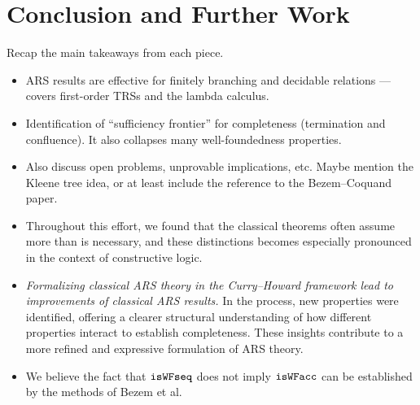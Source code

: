 \section{Conclusion and Further Work}
\label{sec:Conclusion}

Recap the main takeaways from each piece.
\begin{itemize}
  \item ARS results are effective for finitely branching and decidable relations
  --- covers first-order TRSs and the lambda calculus.
  \item Identification of ``sufficiency frontier'' for completeness (termination and confluence).
  It also collapses many well-foundedness properties.
  \item Also discuss open problems, unprovable implications, etc.
  Maybe mention the Kleene tree idea, or at least include the reference to the Bezem--Coquand paper.
  \item Throughout this effort, we found that the classical theorems often assume
  more than is necessary, and these distinctions becomes especially pronounced
  in the context of constructive logic.
  \item \emph{Formalizing classical ARS theory in the Curry--Howard framework
  lead to improvements of classical ARS results.} In the process, new properties were identified,
   offering a clearer structural understanding of how different properties interact
    to establish completeness. These insights contribute to a more refined and
     expressive formulation of ARS theory.
  \item We believe the fact that $\mathtt{isWFseq}$ does not imply $\mathtt{isWFacc}$
  can be established by the methods of Bezem et al.

\end{itemize}
